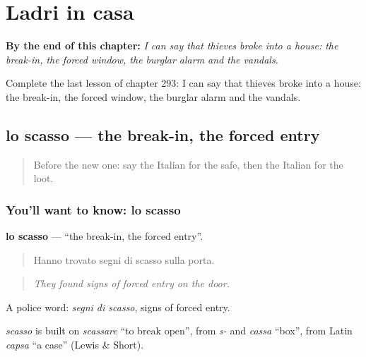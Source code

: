 
\chapter{Ladri in casa}
\label{ch:it-ladri-in-casa}

\begin{chapteropening}
\textbf{By the end of this chapter:} \emph{I can say that thieves broke into a house: the break-in, the forced window, the burglar alarm and the vandals.}

Complete the last lesson of chapter 293: I can say that thieves broke into a house: the break-in, the forced window, the burglar alarm and the vandals.
\end{chapteropening}

\section[lo scasso]{lo scasso — the break-in, the forced entry}

\label{lesson:IT-C293-scasso}



\begin{quote}
Before the new one: say the Italian for the safe, then the Italian for the loot.
\end{quote}

\subsection*{You'll want to know: lo scasso}
\textbf{lo scasso} — \textquotedblleft{}the break-in, the forced entry\textquotedblright{}.

\begin{quote}
Hanno trovato segni di scasso sulla porta.
\end{quote}

\begin{quote}
\emph{They found signs of forced entry on the door.}
\end{quote}

A police word: \emph{segni di scasso}, signs of forced entry.

\begin{cousinweb}
\emph{scasso} is built on \emph{scassare} \textquotedblleft{}to break open\textquotedblright{}, from \emph{s-} and \emph{cassa} \textquotedblleft{}box\textquotedblright{}, from Latin \emph{capsa} \textquotedblleft{}a case\textquotedblright{} (Lewis \& Short).
\end{cousinweb}

